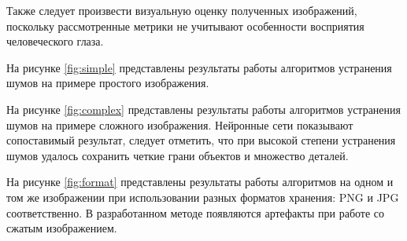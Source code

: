 Также следует произвести визуальную оценку полученных изображений, поскольку рассмотренные метрики не учитывают особенности восприятия человеческого глаза.

На рисунке \ref{fig:simple} представлены результаты работы алгоритмов устранения шумов на примере простого изображения.

На рисунке \ref{fig:complex} представлены результаты работы алгоритмов устранения шумов на примере сложного изображения. Нейронные сети показывают сопоставимый результат, следует отметить, что при высокой степени устранения шумов удалось сохранить четкие грани объектов и множество деталей.

На рисунке \ref{fig:format} представлены результаты работы алгоритмов на одном и том же изображении при использовании разных форматов хранения: PNG и JPG соответственно. В разработанном методе появляются артефакты при работе со сжатым изображением.

